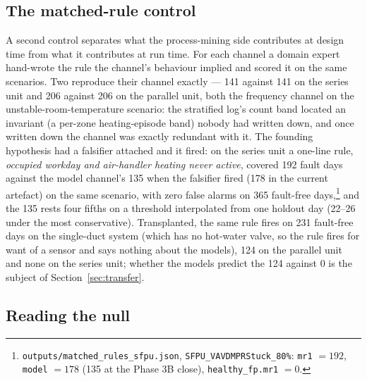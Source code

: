 \documentclass[runningheads]{llncs}
\begin{document}
\subsection{The matched-rule control}

A second control separates what the process-mining side contributes at design time from what it contributes at run time. For each channel a domain expert hand-wrote the rule the channel's behaviour implied and scored it on the same scenarios. Two reproduce their channel exactly --- 141 against 141 on the series unit and 206 against 206 on the parallel unit, both the frequency channel on the unstable-room-temperature scenario: the stratified log's count band located an invariant (a per-zone heating-episode band) nobody had written down, and once written down the channel was exactly redundant with it. The founding hypothesis had a falsifier attached and it fired: on the series unit a one-line rule, \emph{occupied workday and air-handler heating never active}, covered 192 fault days against the model channel's 135 when the falsifier fired (178 in the current artefact) on the same scenario, with zero false alarms on 365 fault-free days,\footnote{\texttt{outputs/matched\_rules\_sfpu.json}, \texttt{SFPU\_VAVDMPRStuck\_80\%}: \texttt{mr1} $=192$, \texttt{model} $=178$ (135 at the Phase 3B close), \texttt{healthy\_fp.mr1} $=0$.} and the 135 rests four fifths on a threshold interpolated from one holdout day (22--26 under the most conservative). Transplanted, the same rule fires on 231 fault-free days on the single-duct system (which has no hot-water valve, so the rule fires for want of a sensor and says nothing about the models), 124 on the parallel unit and none on the series unit; whether the models predict the 124 against 0 is the subject of Section~\ref{sec:transfer}.

\subsection{Reading the null}
\end{document}
